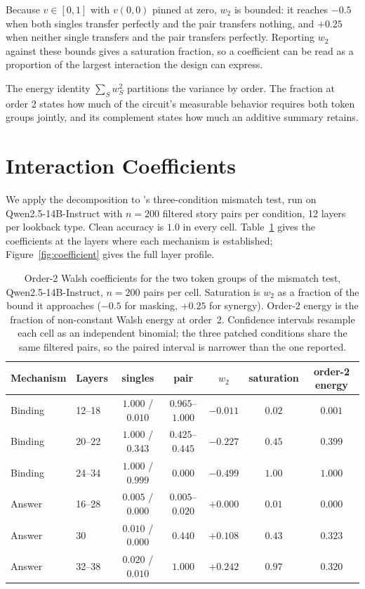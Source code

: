 \documentclass{article}
\begin{document}
Because $v \in [0,1]$ with $v(0,0)$ pinned at zero, $w_2$ is bounded: it reaches $-0.5$ when both singles transfer perfectly and the pair transfers nothing, and $+0.25$ when neither single transfers and the pair transfers perfectly. Reporting $w_2$ against these bounds gives a saturation fraction, so a coefficient can be read as a proportion of the largest interaction the design can express.

The energy identity $\sum_S w_S^2$ partitions the variance by order. The fraction at order 2 states how much of the circuit's measurable behavior requires both token groups jointly, and its complement states how much an additive summary retains.


\section{Interaction Coefficients}

We apply the decomposition to \citet{prakash2025lookback}'s three-condition mismatch test, run on Qwen2.5-14B-Instruct with $n = 200$ filtered story pairs per condition, 12 layers per lookback type. Clean accuracy is $1.0$ in every cell. Table~\ref{tab:interaction} gives the coefficients at the layers where each mechanism is established; Figure~\ref{fig:coefficient} gives the full layer profile.

\begin{table}[t]
\centering
\caption{Order-2 Walsh coefficients for the two token groups of the mismatch test, Qwen2.5-14B-Instruct, $n = 200$ pairs per cell. Saturation is $w_2$ as a fraction of the bound it approaches ($-0.5$ for masking, $+0.25$ for synergy). Order-2 energy is the fraction of non-constant Walsh energy at order~2. Confidence intervals resample each cell as an independent binomial; the three patched conditions share the same filtered pairs, so the paired interval is narrower than the one reported.}
\label{tab:interaction}
\vspace{0.5\baselineskip}
\begin{tabular}{llccccc}
\toprule
Mechanism & Layers & singles & pair & $w_2$ & saturation & order-2 energy \\
\midrule
Binding & 12--18 & $1.000$ / $0.010$ & $0.965$--$1.000$ & $-0.011$ & $0.02$ & $0.001$ \\
Binding & 20--22 & $1.000$ / $0.343$ & $0.425$--$0.445$ & $-0.227$ & $0.45$ & $0.399$ \\
Binding & 24--34 & $1.000$ / $0.999$ & $0.000$ & $-0.499$ & $1.00$ & $1.000$ \\
\midrule
Answer & 16--28 & $0.005$ / $0.000$ & $0.005$--$0.020$ & $+0.000$ & $0.01$ & $0.000$ \\
Answer & 30 & $0.010$ / $0.000$ & $0.440$ & $+0.108$ & $0.43$ & $0.323$ \\
Answer & 32--38 & $0.020$ / $0.010$ & $1.000$ & $+0.242$ & $0.97$ & $0.320$ \\
\bottomrule
\end{tabular}
\end{table}
\end{document}
